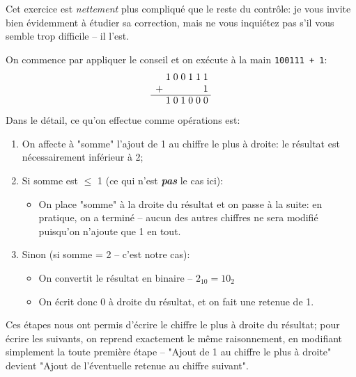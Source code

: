 \documentclass[11pt,a4paper]{exam}
\begin{document}
\begin{questions}
\begin{spacing}{1}
            \begin{solution}
            	Cet exercice est \textit{nettement} plus compliqué que le reste du contrôle: je vous invite bien évidemment à étudier sa correction, mais ne vous inquiétez pas s'il vous semble trop difficile -- il l'est.
            	
            	On commence par appliquer le conseil et on exécute à la main \texttt{100111 + 1}:
            	\[
            	\begin{array}{r *{7}{@{\;}c}}
            		&1 & 0 & 0 & 1 & 1 & 1 \\
            		+ & &  &  &  &  & 1 \\
            		\cline{1-7}
            		&1 & 0 & 1 & 0 & 0 & 0 \\
            	\end{array}
            	\]
            	Dans le détail, ce qu'on effectue comme opérations est:
            	\begin{enumerate}
            		\item On affecte à "somme" l'ajout de 1 au chiffre le plus à droite: le résultat est nécessairement inférieur à 2;
            		\item Si somme est $\le$ 1 (ce qui n'est \textbf{\textit{pas}} le cas ici):
            		\begin{itemize}
            			\item On place "somme" à la droite du résultat et on passe à la suite: en pratique, on a terminé -- aucun des autres chiffres ne sera modifié puisqu'on n'ajoute que 1 en tout.
            		\end{itemize}
            		\item Sinon (si somme = 2 -- c'est notre cas):
            		\begin{itemize}
            			\item On convertit le résultat en binaire -- $2_{10} = 10_2$
            			\item On écrit donc 0 à droite du résultat, et on fait une retenue de 1.
            		\end{itemize}            		
            	\end{enumerate}

           		Ces étapes nous ont permis d'écrire le chiffre le plus à droite du résultat; pour écrire les suivants, on reprend exactement le même raisonnement, en modifiant simplement la toute première étape -- "Ajout de 1 au chiffre le plus à droite" devient "Ajout de l'éventuelle retenue au chiffre suivant".
           		

\end{solution}
\end{spacing}
\end{questions}
\end{document}
